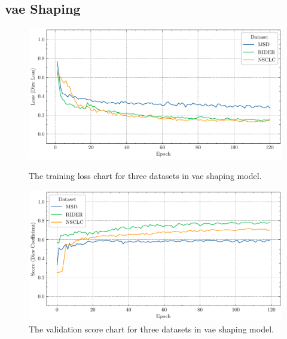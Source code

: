 \documentclass[11pt,times,oneside,openright]{eeereport}
\begin{document}
\begin{appendices}
\section{\acrshort{vae} Shaping}
\begin{figure}[!htb]
   \begin{minipage}{0.48\textwidth}
     \centering
     \includegraphics[width=\linewidth]{fig/result/vae_train.pdf}
     \caption{The training loss chart for three datasets in \acrshort{vae} shaping model.}\label{fig:app_vae_train}
   \end{minipage}\hfill
   \begin{minipage}{0.48\textwidth}
     \centering
     \includegraphics[width=\linewidth]{fig/result/vae_val.pdf}
     \caption{The validation score chart for three datasets in \acrshort{vae} shaping model.
}\label{fig:app_vae_val}
   \end{minipage}
\end{figure}


\end{appendices}
\end{document}
